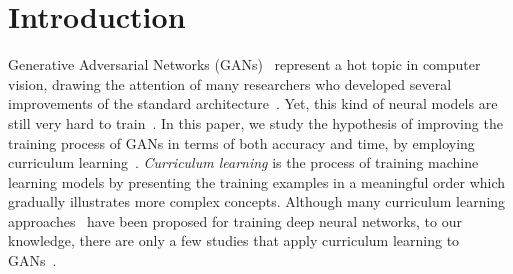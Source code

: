 \documentclass[10pt,twocolumn,letterpaper]{article}
\begin{document}
\setlength{\abovedisplayskip}{4pt}
\setlength{\belowdisplayskip}{4pt}

\section{Introduction}
\vspace{-0.1cm}
Generative Adversarial Networks (GANs)~\cite{Goodfellow-NIPS-2014} represent a hot topic in computer vision, drawing the attention of many researchers who developed several improvements of the standard architecture~\cite{Arjovsky-arXiv-2017,Choi-CVPR-2018,Gulrajani-NIPS-2017,Isola-CVPR-2017,Lin-NIPS-2018,Mao-ICCV-2017,Mirza-arXiv-2014,Odena-ICML-2017,Radford-ICLR-2016,Reed-ICML-2016,Tolstikhin-NIPS-2017,Wang-ECCV-2016}. Yet, this kind of neural models are still very hard to train~\cite{Mescheder-NIPS-2017}. In this paper, we study the hypothesis of improving the training process of GANs in terms of both accuracy and time, by employing curriculum learning~\cite{Bengio-ICML-2009}. \emph{Curriculum learning} is the process of training machine learning models by presenting the training examples in a meaningful order which gradually illustrates more complex concepts. Although many curriculum learning approaches~\cite{Gong-TIP-2016,Graves-ICML-2017,Gui-FG-2017,Ionescu-CVPR-2016,Jiang-ICML-2018,Li-BMVC-2017,Morerio-ICCV-2017,Wang-ICPR-2018,Wang-ECCV-2018,Zhang-IJCV-2019} have been proposed for training deep neural networks, to our knowledge, there are only a few studies that apply curriculum learning to GANs~\cite{Doan-AAAI-2019,Ghasedi-CVPR-2019}.
\end{document}
